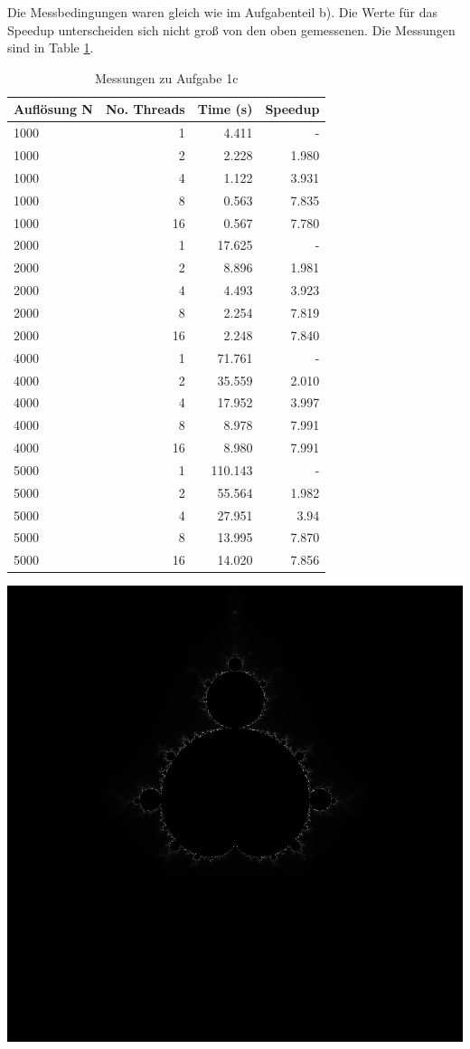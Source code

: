 \documentclass{report}
\begin{document}
        Die Messbedingungen waren gleich wie im Aufgabenteil b). Die Werte für das Speedup unterscheiden sich nicht groß von den oben gemessenen. Die Messungen sind in Table  \ref{Table:1c}.\\
        \begin{table}
        \begin{tabular}{|l|r|r|r|}
        	\hline
        	 Auflösung N & No. Threads &  Time (s) & Speedup \\
        	 	\hline
        	 1000& 1 &  4.411 & - \\
        	 1000& 2 &  2.228 & 1.980 \\
        	 1000& 4 &  1.122 & 3.931 \\
        	 1000& 8 &  0.563 & 7.835\\
        	 1000& 16 &  0.567 & 7.780 \\
        	\hline
        	2000& 1 & 17.625 & - \\
        	2000& 2 &  8.896& 1.981 \\
        	2000& 4 &  4.493& 3.923 \\
        	2000& 8 &  2.254& 7.819 \\
        	2000& 16 &  2.248& 7.840 \\
        	\hline
        	4000& 1 & 71.761 & - \\
        	4000& 2 &  35.559 & 2.010 \\
        	4000& 4 &  17.952& 3.997 \\
        	4000& 8 &  8.978 & 7.991\\
        	4000& 16 &  8.980 & 7.991 \\
        	\hline
        	5000& 1 &  110.143 & - \\
        	5000& 2 &  55.564 & 1.982 \\
        	5000& 4 &  27.951 & 3.94 \\
        	5000& 8 &  13.995 & 7.870 \\
        	5000& 16 &  14.020 & 7.856\\
        	\hline
        \end{tabular}
        \caption{Messungen zu Aufgabe 1c}
         \label{Table:1c}
        \end{table}
	\begin{center}
		\includegraphics[width=0.6\linewidth]{Aufgaben-Ressourcen/normal-1000.jpg}	
	\end{center}
\end{document}
